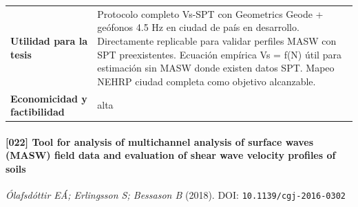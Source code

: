 \begin{center}
\begin{tabularx}{\textwidth}{@{}>{\bfseries}p{3.3cm} X@{}}
Utilidad para la tesis & Protocolo completo Vs-SPT con Geometrics Geode + geófonos 4.5 Hz en ciudad de país en desarrollo. Directamente replicable para validar perfiles MASW con SPT preexistentes. Ecuación empírica Vs = f(N) útil para estimación sin MASW donde existen datos SPT. Mapeo NEHRP ciudad completa como objetivo alcanzable. \\
Economicidad y factibilidad & alta \\
\bottomrule
\end{tabularx}
\end{center}

\paragraph{[022] Tool for analysis of multichannel analysis of surface waves (MASW) field data and evaluation of shear wave velocity profiles of soils} \emph{Ólafsdóttir EÁ; Erlingsson S; Bessason B} (2018).
{\scriptsize DOI: \texttt{10.1139/cgj-2016-0302}}

